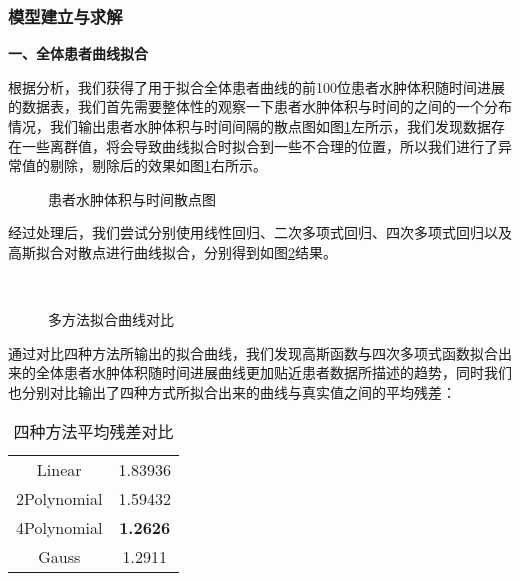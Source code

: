 \documentclass[bwprint]{gmcmthesis}
\begin{document}
			\subsubsection{模型建立与求解}
				\textbf{一、全体患者曲线拟合}
				
				根据分析，我们获得了用于拟合全体患者曲线的前100位患者水肿体积随时间进展的数据表，我们首先需要整体性的观察一下患者水肿体积与时间的之间的一个分布情况，我们输出患者水肿体积与时间间隔的散点图如图\ref{fig:8}左所示，我们发现数据存在一些离群值，将会导致曲线拟合时拟合到一些不合理的位置，所以我们进行了异常值的剔除，剔除后的效果如图\ref{fig:8}右所示。
				
				\begin{figure}[H]
					\centering
					\qquad
					\caption{患者水肿体积与时间散点图}
					\label{fig:8}
				\end{figure}
				
				经过处理后，我们尝试分别使用线性回归、二次多项式回归、四次多项式回归以及高斯拟合对散点进行曲线拟合，分别得到如图\ref{fig:9}结果。
				
				\begin{figure}[htp!]
					\centering
					\qquad
					 \\
					\qquad
					\caption{多方法拟合曲线对比}
					\label{fig:9}
				\end{figure}
				
				通过对比四种方法所输出的拟合曲线，我们发现高斯函数与四次多项式函数拟合出来的全体患者水肿体积随时间进展曲线更加贴近患者数据所描述的趋势，同时我们也分别对比输出了四种方式所拟合出来的曲线与真实值之间的平均残差：
				
				\begin{table}[H]
					\caption{四种方法平均残差对比}
					\label{tab:8}
					\begin{tabular}{cc}
						\toprule[1.5pt]
						\makebox[0.5\textwidth][c]{Methods} &
						\makebox[0.5\textwidth][c]{Mean Risdual} \\
						\midrule[1pt]
						Linear & 1.83936 \\
						2Polynomial & 1.59432 \\
						4Polynomial & \textbf{1.2626} \\
						Gauss & 1.2911 \\
						\bottomrule[1.5pt]
					\end{tabular}			
				\end{table}
				
\end{document}
